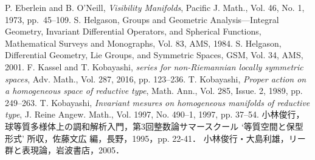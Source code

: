  P. Eberlein and B. O'Neill, \textit{Visibility Manifolds}, Pacific J. Math., Vol. 46, No. 1, 1973, pp.~45--109.
 S. Helgason, Groups and Geometric Analysis---Integral Geometry, Invariant Differential Operators, and Spherical Functions, Mathematical Surveys and Monographs, Vol. 83, AMS, 1984.
 S. Helgason, Differential Geometry, Lie Groups, and Symmetric Spaces, GSM, Vol. 34, AMS, 2001.
 F. Kassel and T. Kobayashi, \textit{{\Poincare} series for non-Riemannian locally symmetric spaces}, Adv. Math., Vol. 287, 2016, pp. 123--236.
 T. Kobayashi, 
  \textit{Proper action on a homogeneous space of reductive type},
  Math. Ann., Vol. 285, Issue. 2, 1989, pp. 249--263.  
 T. Kobayashi, \textit{Invariant mesures on homogeneous manifolds of reductive type}, J. Reine Angew. Math., Vol. 1997, No. 490--1, 1997, pp. 37--54.
 小林俊行，球等質多様体上の調和解析入門，第3回整数論サマースクール `等質空間と保型形式' 所収，佐藤文広 編，長野，1995，pp. 22-41．
 小林俊行・大島利雄，リー群と表現論，岩波書店，2005．
